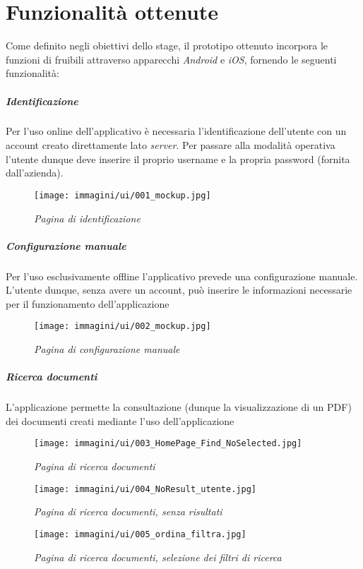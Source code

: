 \newpage
\chapter{Funzionalità ottenute}
\label{cap:funzionalità-ottenute}
Come definito negli obiettivi dello stage, il prototipo ottenuto incorpora le funzioni di \app fruibili attraverso apparecchi \textit{Android} e \textit{iOS}, fornendo le seguenti funzionalità:

\paragraph{Identificazione}
Per l'uso online dell'applicativo è necessaria l'identificazione dell'utente con un account creato direttamente lato \textit{server}. Per passare alla modalità operativa l'utente dunque deve inserire il proprio username e la propria password (fornita dall'azienda).

\begin{figure}[ht]
	\centering
	\texttt{[image: immagini/ui/001\_mockup.jpg]}
	\caption{\textit{Pagina di identificazione}}
\end{figure}\FloatBarrier

\paragraph{Configurazione manuale}
Per l'uso esclusivamente offline l'applicativo prevede una configurazione manuale. L'utente dunque, senza avere un account, può inserire le informazioni necessarie per il funzionamento dell'applicazione

\begin{figure}[ht]
	\centering
	\texttt{[image: immagini/ui/002\_mockup.jpg]}
	\caption{\textit{Pagina di configurazione manuale}}
\end{figure}\FloatBarrier

\paragraph{Ricerca documenti}
L'applicazione permette la consultazione (dunque la visualizzazione di un PDF) dei documenti creati mediante l'uso dell'applicazione

\begin{figure}[ht]
	\centering
	\texttt{[image: immagini/ui/003\_HomePage\_Find\_NoSelected.jpg]}
	\caption{\textit{Pagina di ricerca documenti}}
\end{figure}\FloatBarrier
\begin{figure}[ht]
	\centering
	\texttt{[image: immagini/ui/004\_NoResult\_utente.jpg]}
	\caption{\textit{Pagina di ricerca documenti, senza risultati}}
\end{figure}\FloatBarrier
\begin{figure}[ht]
	\centering
	\texttt{[image: immagini/ui/005\_ordina\_filtra.jpg]}
	\caption{\textit{Pagina di ricerca documenti, selezione dei filtri di ricerca}}
\end{figure}\FloatBarrier


